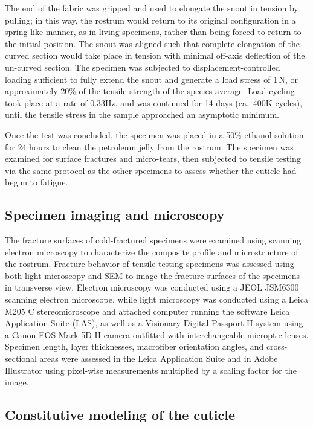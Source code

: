 \documentclass[twocolumn, linenumbers, superscriptaddress, nofootinbib]{revtex4-1}
\begin{document}
				The end of the fabric was gripped and used to elongate the snout in tension by pulling; in this way, the rostrum would return to its original configuration in a spring-like manner, as in living specimens, rather than being forced to return to the initial position.
				The snout was aligned such that complete elongation of the curved section would take place in tension with minimal off-axis deflection of the un-curved section.
				The specimen was subjected to displacement-controlled loading sufficient to fully extend the snout and generate a load stress of 1\,N, or approximately 20\% of the tensile strength of the species average.
				Load cycling took place at a rate of 0.33Hz, and was continued for 14 days (ca.~400K cycles), until the tensile stress in the sample approached an asymptotic minimum.
				
				Once the test was concluded, the specimen was placed in a 50\% ethanol solution for 24 hours to clean the petroleum jelly from the rostrum.
				The specimen was examined for surface fractures and micro-tears, then subjected to tensile testing via the same protocol as the other specimens to assess whether the cuticle had begun to fatigue.
		
		\subsection*{Specimen imaging and microscopy}
			The fracture surfaces of cold-fractured specimens were examined using scanning electron microscopy to characterize the composite profile and microstructure of the rostrum.
			Fracture behavior of tensile testing specimens was assessed using both light microscopy and SEM to image the fracture surfaces of the specimens in transverse view.
			Electron microscopy was conducted using a JEOL JSM6300 scanning electron microscope, while light microscopy was conducted using a Leica M205 C stereomicroscope and attached	computer running the software Leica Application Suite (LAS), as well as a Visionary Digital Passport II system using a Canon EOS Mark 5D II camera outfitted with interchangeable microptic lenses.
			Specimen length, layer thicknesses, macrofiber orientation angles, and cross-sectional areas were assessed in the Leica Application Suite and in Adobe Illustrator using pixel-wise measurements multiplied by a scaling factor for the image.
			
		\subsection*{Constitutive modeling of the cuticle}
\end{document}
